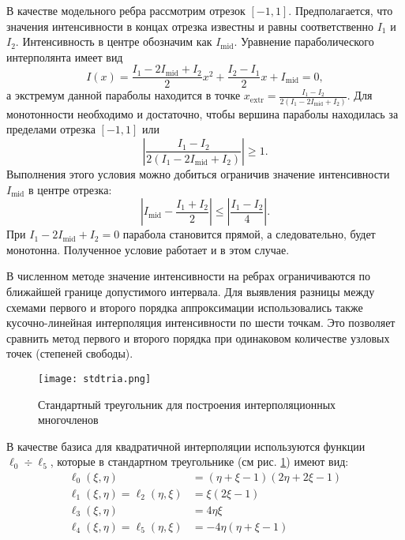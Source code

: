 В качестве модельного ребра рассмотрим отрезок $[-1, 1]$. Предполагается, что значения интенсивности в концах отрезка известны и равны соответственно $I_1$ и $I_2$. Интенсивность в центре обозначим как $I_\text{mid}$. Уравнение параболического интерполянта имеет вид
\begin{equation}
I(x) = \frac{I_1 - 2I_\text{mid} + I_2}{2}x^2 + \frac{I_2 - I_1}{2} x + I_\text{mid} = 0, 
\end{equation}
а экстремум данной параболы находится в точке $x_{\text{extr}} = \frac{I_1 - I_2}{2(I_1 - 2I_\text{mid} + I_2)}$.
Для монотонности необходимо и достаточно, чтобы вершина параболы находилась за пределами отрезка $[-1,1]$ или
\begin {equation}
\left| \frac{I_1 - I_2}{2(I_1 - 2I_\text{mid} + I_2)}\right| \geqslant 1.
\end {equation}
Выполнения этого условия можно добиться ограничив значение интенсивности $I_\text{mid}$ в центре отрезка:
\begin {equation}
\left| I_\text{mid} - \frac{I_1 + I_2}{2}\right| \leqslant \left| \frac{I_1 - I_2}{4}\right| .
\end {equation}
При $I_1 - 2I_\text{mid} + I_2 = 0$ парабола становится прямой, а следовательно, будет монотонна. Полученное условие работает и в этом случае.

В численном методе значение интенсивности на ребрах ограничиваются по ближайшей границе допустимого интервала. Для выявления разницы между схемами первого и второго порядка аппроксимации использовались также кусочно-линейная интерполяция интенсивности по шести точкам. Это позволяет сравнить метод первого и второго порядка при одинаковом количестве узловых точек (степеней свободы). 

\begin{figure}[ht!]
\centering
\texttt{[image: stdtria.png]}
\caption{Стандартный треугольник для построения интерполяционных многочленов}
\label{fig:stdtria}
\end{figure}
В качестве базиса для квадратичной интерполяции используются функции $\ell_0 \div \ell_5$, которые в стандартном треугольнике (см рис. \ref{fig:stdtria}) имеют вид:
\begin {equation}
\begin {aligned}
\ell_0 (\xi, \eta)&= (\eta + \xi -1)(2\eta + 2\xi - 1) \\
\ell_1 (\xi, \eta) = \ell_2 (\eta, \xi)&= \xi(2\xi - 1) \\
\ell_3 (\xi, \eta)&= 4\eta\xi \\
\ell_4 (\xi, \eta) = \ell_5(\eta, \xi)&= -4\eta(\eta + \xi - 1)
\end {aligned}
\end {equation}

